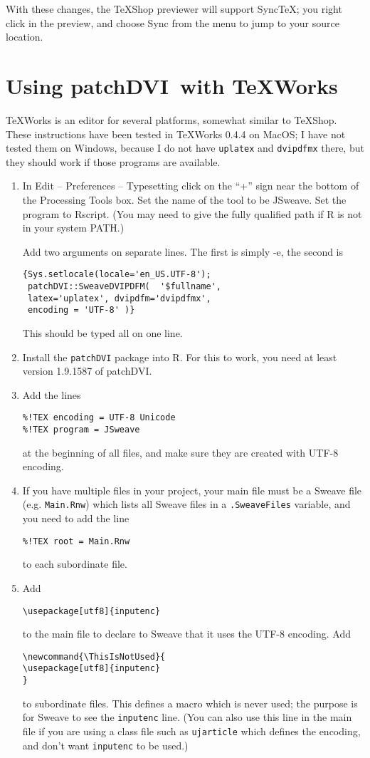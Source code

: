\documentclass[12pt]{ujarticle}
\newcommand{\ThisIsNotUsed}{
\usepackage[utf8]{inputenc}
}
\newcommand{\patchDVI}{\patchDVIn\ }
\newcommand{\patchDVIn}{\textbf{patchDVI}}
\begin{document}
With these changes, the TeXShop previewer will support SyncTeX; you right click in the preview, and choose Sync from the menu
to jump to your source location.

\section{Using \patchDVI with TeXWorks}
\label{sec:texworks}

TeXWorks is an editor for several platforms, somewhat similar to TeXShop.  These instructions 
have been tested in TeXWorks 0.4.4 on MacOS; I have not tested them on Windows, because
I do not have \texttt{uplatex} and \texttt{dvipdfmx} there, but they should work if those
programs are available. 

\begin{enumerate}
\item 
In 
Edit -- Preferences -- Typesetting 
click on the ``+'' sign near the bottom of the Processing Tools box.  Set the name of the tool to be JSweave.
Set the program to Rscript.  (You may need to give the fully qualified path
if R is not in your system PATH.)

Add two arguments on separate lines.  The first is simply -e, the second is
\begin{verbatim}
{Sys.setlocale(locale='en_US.UTF-8');
 patchDVI::SweaveDVIPDFM(  '$fullname',
 latex='uplatex', dvipdfm='dvipdfmx', 
 encoding = 'UTF-8' )}
\end{verbatim}
This should be typed all on one line.

\item Install the \texttt{patchDVI} package into R.  For this to work,  you need
at least version 1.9.1587 of patchDVI.
\item Add the lines 
\begin{verbatim}
%!TEX encoding = UTF-8 Unicode
%!TEX program = JSweave
\end{verbatim}
at the beginning of all files, and make sure they are created with UTF-8 encoding.
\item If you have multiple files in your project, your main file must be a Sweave file
(e.g. \texttt{Main.Rnw}) which lists all Sweave files in a \texttt{.SweaveFiles} variable, 
and you need to add the line
\begin{verbatim}
%!TEX root = Main.Rnw
\end{verbatim}
to each subordinate file.
\item Add
\begin{verbatim}
\usepackage[utf8]{inputenc}
\end{verbatim}
to the main file to declare to Sweave that it uses the UTF-8 encoding.  Add
\begin{verbatim}
\newcommand{\ThisIsNotUsed}{
\usepackage[utf8]{inputenc}
}
\end{verbatim}
to subordinate files.  This defines a macro which is never used; the purpose is
for Sweave to see the \texttt{inputenc} line.  (You can also use this line in the main file
if you are using a class file such as \texttt{ujarticle} which defines the encoding, 
and don't want \texttt{inputenc} to be used.)


\end{enumerate}
\end{document}

